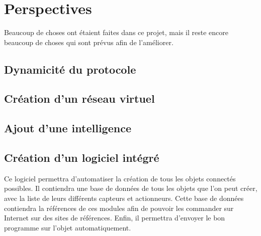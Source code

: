 \chapter*{Perspectives}

Beaucoup de choses ont étaient faites dans ce projet, mais il reste encore beaucoup de choses qui sont prévus 
afin de l'améliorer.

\section*{Dynamicité du protocole}

\section*{Création d'un réseau virtuel}

\section*{Ajout d'une intelligence}

\section*{Création d'un logiciel intégré}

Ce logiciel permettra d'automatiser la création de tous les objets connectés possibles. Il contiendra une 
base de données de tous les objets que l'on peut créer, avec la liste de leurs différents capteurs et 
actionneurs. Cette base de données contiendra la références de ces modules afin de pouvoir les commander sur 
Internet sur des sites de références. Enfin, il permettra d'envoyer le bon programme sur 
l'objet automatiquement.

